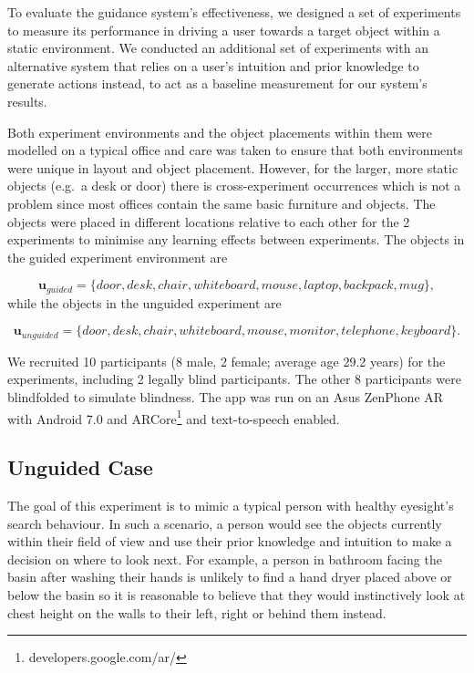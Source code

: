 \documentclass[runningheads]{llncs}
\begin{document}
To evaluate the guidance system's effectiveness, we designed a set of experiments to measure its performance in driving a user towards a target object within a static environment. 
We conducted an additional set of experiments with an alternative system that relies on a user's intuition and prior knowledge to generate actions instead, to act as a baseline measurement for our system's results. 

Both experiment environments and the object placements within them were modelled on a typical office and care was taken to ensure that both environments were unique in layout and object placement. 
However, for the larger, more static objects (e.g.\ a desk or door) there is cross-experiment occurrences which is not a problem since most offices contain the same basic furniture and objects. 
The objects were placed in different locations relative to each other for the 2 experiments to minimise any learning effects between experiments. 
The objects in the guided experiment environment are

\begin{equation*}
  \mathbf{u}_{guided} = \{ door, desk, chair, whiteboard, mouse, laptop, backpack, mug \},
\end{equation*}
while the objects in the unguided experiment are

\begin{equation*}
  \mathbf{u}_{unguided} = \{ door, desk, chair, whiteboard, mouse, monitor, telephone, keyboard \}.
\end{equation*}

We recruited 10 participants (8 male, 2 female; average age 29.2 years) for the experiments, including 2 legally blind participants. 
The other 8 participants were blindfolded to simulate blindness. 
The app was run on an Asus ZenPhone AR with Android 7.0 and ARCore\footnote{developers.google.com/ar/} and text-to-speech enabled. 

\subsection{Unguided Case}

The goal of this experiment is to mimic a typical person with healthy eyesight's search behaviour. 
In such a scenario, a person would see the objects currently within their field of view and use their prior knowledge and intuition to make a decision on where to look next.
For example, a person in bathroom facing the basin after washing their hands is unlikely to find a hand dryer placed above or below the basin so it is reasonable to believe that they would instinctively look at chest height on the walls to their left, right or behind them instead. 
\end{document}
